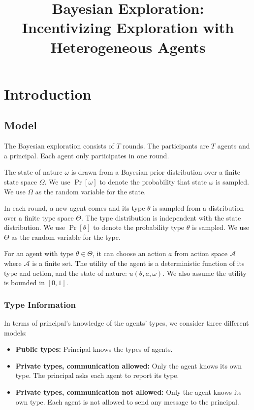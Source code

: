 \documentclass[11pt]{article}
\title{Bayesian Exploration:\\ Incentivizing Exploration with Heterogeneous Agents}
\author{
}
\def\A{\mathcal{A}}
\begin{document}
\maketitle

\section{Introduction}

\subsection{Model}
The Bayesian exploration consists of $T$ rounds. The participants are $T$ agents and a principal. Each agent only participates in one round.

The state of nature $\omega$ is drawn from a Bayesian prior distribution over a finite state space $\varOmega$. We use $\Pr[\omega]$ to denote the probability that state $\omega$ is sampled. We use $\Omega$ as the random variable for the state.

In each round, a new agent comes and its type $\theta$ is sampled from a distribution over a finite type space $\varTheta$. The type distribution is independent with the state distribution. We use $\Pr[\theta]$ to denote the probability type $\theta$ is sampled. We use $\Theta$ as the random variable for the type.

For an agent with type $\theta \in \varTheta$, it can choose an action $a$ from action space $\A$ where $\A$ is a finite set. The utility of the agent is a deterministic function of its type and action, and the state of nature: $u(\theta, a, \omega)$. We also assume the utility is bounded in $[0,1]$.

\subsubsection{Type Information}
In terms of principal's knowledge of the agents' types, we consider three different models:
\begin{itemize}
\item \textbf{Public types:} Principal knows the types of agents.
\item \textbf{Private types, communication allowed:} Only the agent knows its own type. The principal asks each agent to report its type.
\item \textbf{Private types, communication not allowed:}  Only the agent knows its own type. Each agent is not allowed to send any message to the principal.
\end{itemize}











\end{document}
